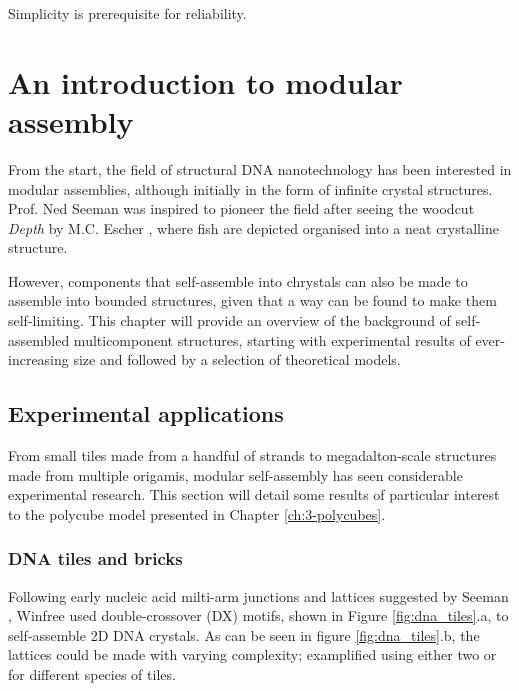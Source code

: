 \begin{savequote}[8cm]
Simplicity is prerequisite for reliability.
\end{savequote}

\chapter{An introduction to modular assembly}

\minitoc

From the start, the field of structural DNA nanotechnology has been interested in modular assemblies, although initially in the form of infinite crystal structures. Prof. Ned Seeman was inspired to pioneer the field after seeing the woodcut \emph{Depth} by M.C. Escher \cite{seeman_2016}, where fish are depicted organised into a neat crystalline structure.

However, components that self-assemble into chrystals can also be made to assemble into bounded structures, given that a way can be found to make them self-limiting. This chapter will provide an overview of the background of self-assembled multicomponent structures, starting with experimental results of ever-increasing size and followed by a selection of theoretical models.

\section{Experimental applications} \label{sec:experimental_appl}
From small tiles made from a handful of strands to megadalton-scale structures made from multiple origamis, modular self-assembly has seen considerable experimental research. This section will detail some results of particular interest to the polycube model presented in Chapter \ref{ch:3-polycubes}.

\subsection{DNA tiles and bricks}
Following early nucleic acid milti-arm junctions and lattices suggested by Seeman \cite{seeman1982nucleic}, Winfree \cite{winfree1998design} used double-crossover (DX) motifs, shown in Figure \ref{fig:dna_tiles}.a, to self-assemble 2D DNA crystals. As can be seen in figure \ref{fig:dna_tiles}.b, the lattices could be made with varying complexity; examplified using either two or for different species of tiles.

